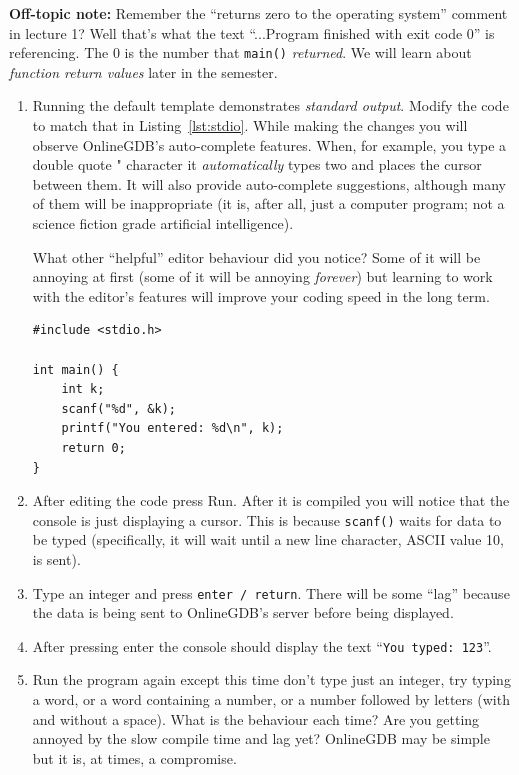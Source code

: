 \documentclass{lab}
\begin{document}
\textbf{Off-topic note:} Remember the ``returns zero to the operating system'' comment in lecture 1? Well that's what the text ``...Program finished with exit code 0'' is referencing. The 0 is the number that \texttt{main()} \textit{returned}. We will learn about \textit{function return values} later in the semester.

\begin{task}{}{}

\begin{enumerate}

\item Running the default template demonstrates \textit{standard output}. Modify the code to match that in Listing~\ref{lst:stdio}. While making the changes you will observe OnlineGDB's auto-complete features. When, for example, you type a double quote " character it \textit{automatically} types two and places the cursor between them. It will also provide auto-complete suggestions, although many of them will be inappropriate (it is, after all, just a computer program; not a science fiction grade artificial intelligence).

What other ``helpful'' editor behaviour did you notice? Some of it will be annoying at first (some of it will be annoying \textit{forever}) but learning to work with the editor's features will improve your coding speed in the long term.

\begin{lstlisting}[style=CStyle,caption=A basic C program which demonstrates input and output.,label=lst:stdio]
#include <stdio.h>

int main() {
	int k;
	scanf("%d", &k);
	printf("You entered: %d\n", k);
	return 0;
}
\end{lstlisting}

\item After editing the code press Run. After it is compiled you will notice that the console is just displaying a cursor. This is because \texttt{scanf()} waits for data to be typed (specifically, it will wait until a new line character, ASCII value 10, is sent).

\item Type an integer and press \texttt{enter / return}. There will be some ``lag'' because the data is being sent to OnlineGDB's server before being displayed.

\item After pressing enter the console should display the text ``\texttt{You typed: 123}''.

\item Run the program again except this time don't type just an integer, try typing a word, or a word containing a number, or a number followed by letters (with and without a space). What is the behaviour each time? Are you getting annoyed by the slow compile time and lag yet? OnlineGDB may be simple but it is, at times, a compromise.

\end{enumerate}
\end{task}\label{tsk:stdio}
\end{document}
